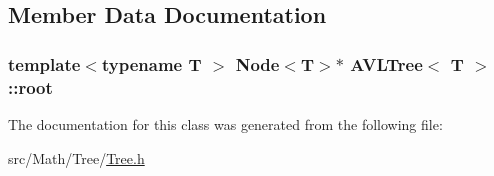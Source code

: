 \subsection{Member Data Documentation}
\subsubsection[{\texorpdfstring{root}{root}}]{\setlength{\rightskip}{0pt plus 5cm}template$<$typename T $>$ {\bf Node}$<$T$>$$\ast$ {\bf A\+V\+L\+Tree}$<$ T $>$\+::root}\hypertarget{class_a_v_l_tree_a12af214b02aa42b44254eca52bc0ea59}{}\label{class_a_v_l_tree_a12af214b02aa42b44254eca52bc0ea59}


The documentation for this class was generated from the following file\+:\begin{DoxyCompactItemize}
\item 
src/\+Math/\+Tree/\hyperlink{_tree_8h}{Tree.\+h}\end{DoxyCompactItemize}
